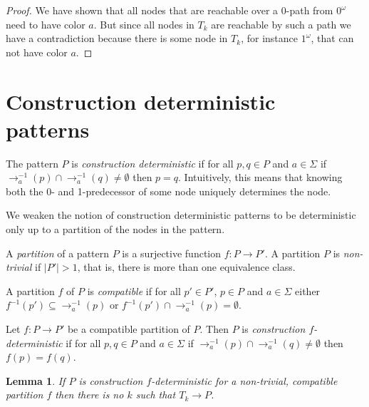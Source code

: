 \documentclass[a4paper]{article}
\newcommand{\prearrow}[1]{{\rightarrow_{#1}^{-1}}}
\newtheorem{lemma}[theorem]{Lemma}
\begin{document}
\begin{proof}
\medskip

We have shown that all nodes that are reachable over a $0$-path from
$0^\omega$ need to have color $a$. But since all nodes in $T_k$ are
reachable by such a path we have a contradiction because there is some
node in $T_k$, for instance $1^\omega$, that can not have color $a$.
\end{proof}


\section{Construction deterministic patterns}

The pattern $P$ is \emph{construction deterministic} if for all $p,q \in
P$ and $a \in \Sigma$ if $\prearrow{a}(p) \cap \prearrow{a}(q) \neq
\emptyset$ then $p = q$. Intuitively, this means that knowing both the
0- and 1-predecessor of some node uniquely determines the node.

We weaken the notion of construction deterministic patterns to be
deterministic only up to a partition of the nodes in the pattern.

A \emph{partition} of a pattern $P$ is a surjective function $f : P \to
P'$. A partition $P$ is \emph{non-trivial} if $|P'| > 1$, that is, there
is more than one equivalence class.

A partition $f$ of $P$ is \emph{compatible} if for all $p' \in P'$, $p
\in P$ and $a \in \Sigma$ either $f^{-1}(p') \subseteq \prearrow{a}(p)$
or $f^{-1}(p') \cap \prearrow{a}(p) = \emptyset$.

Let $f : P \to P'$ be a compatible partition of $P$. Then $P$ is
\emph{construction $f$-deterministic} if for all $p,q \in P$ and $a \in
\Sigma$ if $\prearrow{a}(p) \cap \prearrow{a}(q) \neq \emptyset$ then
$f(p) = f(q)$.

\begin{lemma} \label{killer lemma}
 If $P$ is construction $f$-deterministic for a non-trivial, compatible
partition $f$ then there is no $k$ such that $T_k \to P$.
\end{lemma}
\end{document}
